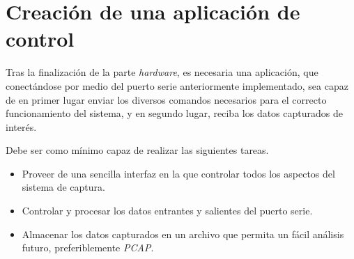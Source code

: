 \section{Creación de una aplicación de control}
Tras la finalización de la parte \emph{hardware}, es necesaria una aplicación, que conectándose por medio del puerto serie anteriormente implementado, sea capaz de en primer lugar enviar los diversos comandos necesarios para el correcto funcionamiento del sistema, y en segundo lugar, reciba los datos capturados de interés.

Debe ser como mínimo capaz de realizar las siguientes tareas.
\begin{itemize}
    \item Proveer de una sencilla interfaz en la que controlar todos los aspectos del sistema de captura.
    \item Controlar y procesar los datos entrantes y salientes del puerto serie.
    \item Almacenar los datos capturados en un archivo que permita un fácil análisis futuro, preferiblemente \emph{PCAP}\cite{tcpdump:pcap}.
\end{itemize}








